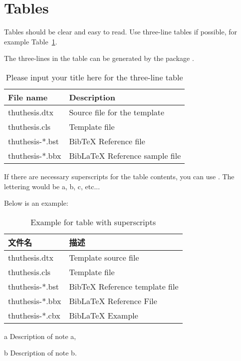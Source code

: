 \section{Tables}

Tables should be clear and easy to read. Use three-line tables if possible, for example Table~\ref{tab:three-line}.

The three-lines in the table can be generated by the package .

\begin{table}
  \centering
  \caption{Please input your title here for the three-line table}
  \begin{tabular}{ll}
    \toprule
    File name          & Description               \\
    \midrule
    thuthesis.dtx   & Source file for the template \\
    thuthesis.cls   & Template file                \\
    thuthesis-*.bst & BibTeX Reference file        \\
    thuthesis-*.bbx & BibLaTeX Reference sample file \\
   
    \bottomrule
  \end{tabular}
  \label{tab:three-line}
\end{table}

If there are necessary superscripts for the table contents, you can use . The lettering would be a, b, c, etc...

Below is an example:

\begin{table}
  \centering
  \begin{threeparttable}[c]
    \caption{Example for table with superscripts}
    \label{tab:three-part-table}
    \begin{tabular}{ll}
      \toprule
      文件名                 & 描述                         \\
      \midrule
      thuthesis.dtx\tnote{a} & Template source file \\
      thuthesis.cls\tnote{b} & Template file        \\
      thuthesis-*.bst        & BibTeX Reference template file                                 \\
      thuthesis-*.bbx        & BibLaTeX Reference File                                               \\
      thuthesis-*.cbx        & BibLaTeX Example     \\
      \bottomrule
    \end{tabular}
    \begin{tablenotes}
      \item [a] Description of note a,
      \item [b] Description of note b.
    \end{tablenotes}
  \end{threeparttable}
\end{table}
